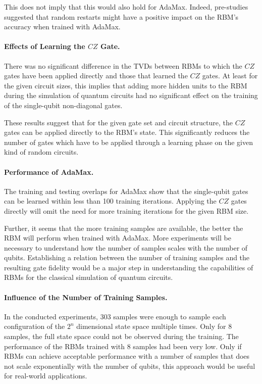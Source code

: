 This does not imply that this would also 
hold for AdaMax. Indeed, pre-studies suggested that random restarts might have a positive 
impact on the RBM's accuracy when trained with AdaMax.

\paragraph{Effects of Learning the $CZ$ Gate.}
There was no significant difference in the TVDs between RBMs to which the $CZ$ gates have 
been applied directly and those that learned the $CZ$ gates. At least for the given circuit 
sizes, this implies that adding more hidden units to the RBM during the simulation of 
quantum circuits had no significant effect on the training of the single-qubit non-diagonal 
gates. 

These results suggest that for the given gate set and circuit structure, the $CZ$ gates can 
be applied directly to the RBM's state. This significantly reduces the number of gates which 
have to be applied through a learning phase on the given kind of random circuits.

\paragraph{Performance of AdaMax.}
The training and testing overlaps for AdaMax show that the single-qubit gates can 
be learned within less than 100 training iterations. Applying 
the $CZ$ gates directly will omit the need for more training iterations for the given RBM size.

Further, it seems that the more training samples are available, the better the RBM will 
perform when trained with AdaMax. More experiments will be necessary 
to understand how the number of samples scales with the number of qubits. Establishing
a relation between the number of training samples and the resulting gate fidelity would 
be a major step in understanding the capabilities of RBMs for the classical simulation of 
quantum circuits.

\paragraph{Influence of the Number of Training Samples.}
In the conducted experiments, 303 samples were enough to sample each configuration of the 
$2^n$ dimensional state space multiple times. Only for 8  samples, the full state space
could not be observed during the training. The performance of the RBMs trained with 8 samples
had been very low. Only if RBMs can achieve acceptable performance with a number of samples 
that does not scale exponentially with the number of qubits, this approach would be useful for 
real-world applications. 

